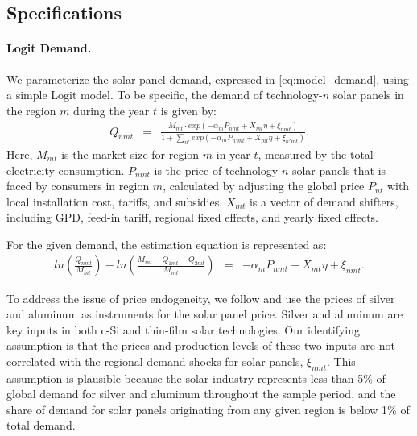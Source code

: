 \documentclass[12pt, letter]{article}
\begin{document}
\subsection{Specifications}
\label{subsec:est_specifications}

\paragraph{Logit Demand.}
We parameterize the solar panel demand, expressed in \eqref{eq:model_demand}, using a simple Logit model. To be specific, the demand of technology-$n$ solar panels in the region $m$ during the year $t$ is given by:
\begin{eqnarray*}
Q_{nmt} & = & \frac{M_{mt}\cdot exp(-\alpha_{m} P_{nmt} + X_{mt}\eta +\xi_{nmt})}{1+\sum_{n'}exp(-\alpha_{m} P_{n'mt} + X_{mt}\eta +\xi_{n'mt})}.  \label{eq:demand_specification}
\end{eqnarray*}
Here, $M_{mt}$ is the market size for region $m$ in year $t$, measured by the total electricity consumption. $P_{nmt}$ is the price of technology-$n$ solar panels that is faced by consumers in region $m$, calculated by adjusting the global price $P_{nt}$ with local installation cost, tariffs, and subsidies. $X_{mt}$ is a vector of demand shifters, including GPD, feed-in tariff, regional fixed effects, and yearly fixed effects. 

For the given demand, the estimation equation is represented as:
\begin{eqnarray}
ln( \frac{Q_{nmt}}{M_{mt}} ) - ln( \frac{M_{mt}- Q_{1mt}- Q_{2mt}}{M_{mt}} ) & = &  -\alpha_{m} P_{nmt} + X_{mt}\eta +\xi_{nmt}. \label{eq:demand_est_mkt}
\end{eqnarray}

To address the issue of price endogeneity, we follow \citet{bollinger2025strategic} and use the prices of silver and aluminum as instruments for the solar panel price. Silver and aluminum are key inputs in both c-Si and thin-film solar technologies. Our identifying assumption is that the prices and production levels of these two inputs are not correlated with the  regional demand shocks for solar panels, $\xi_{nmt}$. This assumption is plausible because the solar industry represents less than 5\% of global demand for silver and aluminum throughout the sample period, and the share of demand for solar panels originating from any given region is below 1\% of total demand.

\end{document}

